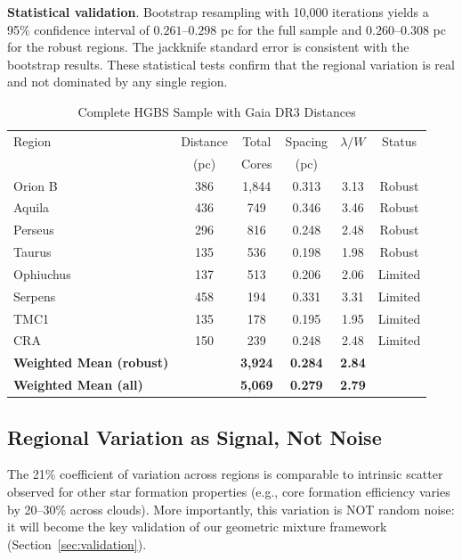 \documentclass[twoside,twocolumn]{mnras}
\begin{document}
\textbf{Statistical validation}. Bootstrap resampling with 10,000 iterations yields a 95\% confidence interval of $0.261$--$0.298$ pc for the full sample and $0.260$--$0.308$ pc for the robust regions. The jackknife standard error is consistent with the bootstrap results. These statistical tests confirm that the regional variation is real and not dominated by any single region.

\begin{table}
\caption{Complete HGBS Sample with Gaia DR3 Distances}
\label{tab:sample}
\begin{tabular}{lccccc}
\toprule
Region & Distance & Total & Spacing & $\lambda/W$ & Status \\
       & (pc)   & Cores & (pc)   &       &  \\
\midrule
Orion B  & 386 & 1,844 & 0.313 & 3.13 & Robust \\
Aquila   & 436 & 749   & 0.346 & 3.46 & Robust \\
Perseus  & 296 & 816   & 0.248 & 2.48 & Robust \\
Taurus   & 135 & 536   & 0.198 & 1.98 & Robust \\
Ophiuchus& 137 & 513   & 0.206 & 2.06 & Limited \\
Serpens  & 458 & 194   & 0.331 & 3.31 & Limited \\
TMC1     & 135 & 178   & 0.195 & 1.95 & Limited \\
CRA      & 150 & 239   & 0.248 & 2.48 & Limited \\
\midrule
\textbf{Weighted Mean (robust)} &  & \textbf{3,924} & \textbf{0.284} & \textbf{2.84} &  \\
\textbf{Weighted Mean (all)} &  & \textbf{5,069} & \textbf{0.279} & \textbf{2.79} &  \\
\bottomrule
\end{tabular}
\end{table}

\subsection{Regional Variation as Signal, Not Noise}

The 21\% coefficient of variation across regions is comparable to intrinsic scatter observed for other star formation properties (e.g., core formation efficiency varies by 20--30\% across clouds). More importantly, this variation is NOT random noise: it will become the key validation of our geometric mixture framework (Section~\ref{sec:validation}).
\end{document}
